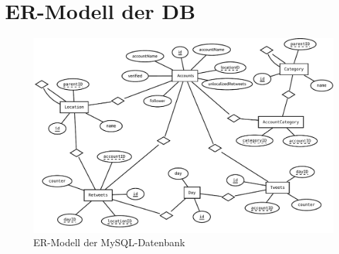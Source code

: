 \section{ER-Modell der DB}
\begin{figure}[h!]
\includegraphics[width=\textwidth,height=\textheight, keepaspectratio=true]{dia/er}
\caption{ER-Modell der MySQL-Datenbank}
\label{fig:mysql-er}
\end{figure}
